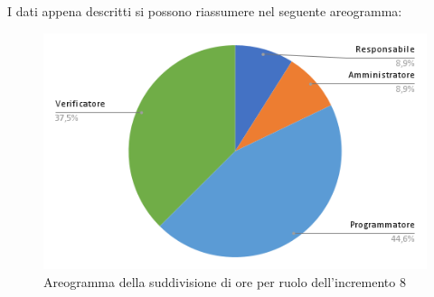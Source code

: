 \pagebreak
I dati appena descritti si possono riassumere nel seguente areogramma:
\begin{figure}[!h]
    \vspace{5px}
    \includegraphics[scale=0.5]{../../../Images/Diagrammi/Diagramma a torta/areogrammaIncremento13.png}
    \centering
    \caption{Areogramma della suddivisione di ore per ruolo dell'incremento 8}
\end{figure}

